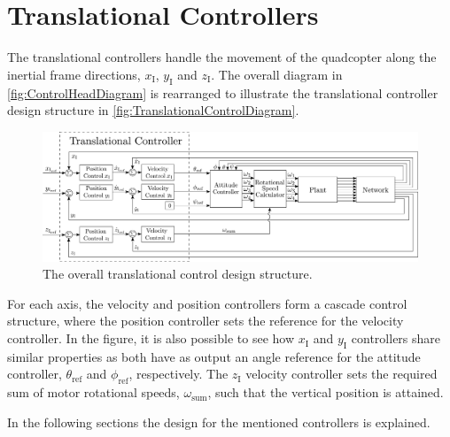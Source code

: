 \section{Translational Controllers} \label{sec:TranslationalController}

The translational controllers handle the movement of the quadcopter along the inertial frame directions, $x_{\mathrm{I}}$, $y_{\mathrm{I}}$ and $z_{\mathrm{I}}$. The overall diagram in \autoref{fig:ControlHeadDiagram} is rearranged to illustrate the translational controller design structure in \autoref{fig:TranslationalControlDiagram}.
%
\begin{figure}[H]
	\centering
	\includegraphics[scale=0.22]{figures/TranslationalControlDiagramexpanded}
	\caption{The overall translational control design structure.}
	\label{fig:TranslationalControlDiagram}
\end{figure}
%
For each axis, the velocity and position controllers form a cascade control structure, where the position controller sets the reference for the velocity controller. In the figure, it is also possible to see how $x_{\mathrm{I}}$ and $y_{\mathrm{I}}$ controllers share similar properties as both have as output an angle reference for the attitude controller, $\theta_{\mathrm{ref}}$ and $\phi_{\mathrm{ref}}$, respectively. 
The $z_{\mathrm{I}}$ velocity controller sets the required sum of motor rotational speeds, $\omega_{\mathrm{sum}}$, such that the vertical position is attained.

In the following sections the design for the mentioned controllers is explained.